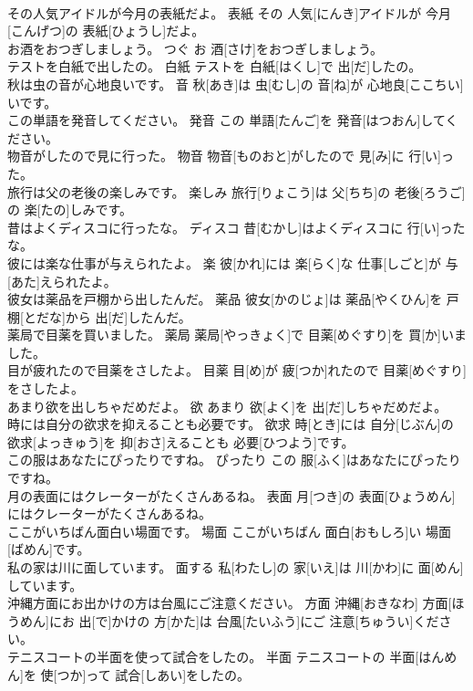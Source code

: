 \documentclass[8pt]{extreport}
\begin{document}
\begin{CJK}{UTF8}{min}
\\	その人気アイドルが今月の表紙だよ。	表紙	その 人気[にんき]アイドルが 今月[こんげつ]の 表紙[ひょうし]だよ。	
\\	お酒をおつぎしましょう。	つぐ	お 酒[さけ]をおつぎしましょう。	
\\	テストを白紙で出したの。	白紙	テストを 白紙[はくし]で 出[だ]したの。	
\\	秋は虫の音が心地良いです。	音	秋[あき]は 虫[むし]の 音[ね]が 心地良[ここちい]いです。	
\\	この単語を発音してください。	発音	この 単語[たんご]を 発音[はつおん]してください。	
\\	物音がしたので見に行った。	物音	物音[ものおと]がしたので 見[み]に 行[い]った。	
\\	旅行は父の老後の楽しみです。	楽しみ	旅行[りょこう]は 父[ちち]の 老後[ろうご]の 楽[たの]しみです。	
\\	昔はよくディスコに行ったな。	ディスコ	昔[むかし]はよくディスコに 行[い]ったな。	
\\	彼には楽な仕事が与えられたよ。	楽	彼[かれ]には 楽[らく]な 仕事[しごと]が 与[あた]えられたよ。	
\\	彼女は薬品を戸棚から出したんだ。	薬品	彼女[かのじょ]は 薬品[やくひん]を 戸棚[とだな]から 出[だ]したんだ。	
\\	薬局で目薬を買いました。	薬局	薬局[やっきょく]で 目薬[めぐすり]を 買[か]いました。	
\\	目が疲れたので目薬をさしたよ。	目薬	目[め]が 疲[つか]れたので 目薬[めぐすり]をさしたよ。	
\\	あまり欲を出しちゃだめだよ。	欲	あまり 欲[よく]を 出[だ]しちゃだめだよ。	
\\	時には自分の欲求を抑えることも必要です。	欲求	時[とき]には 自分[じぶん]の 欲求[よっきゅう]を 抑[おさ]えることも 必要[ひつよう]です。	
\\	この服はあなたにぴったりですね。	ぴったり	この 服[ふく]はあなたにぴったりですね。	
\\	月の表面にはクレーターがたくさんあるね。	表面	月[つき]の 表面[ひょうめん]にはクレーターがたくさんあるね。	
\\	ここがいちばん面白い場面です。	場面	ここがいちばん 面白[おもしろ]い 場面[ばめん]です。	
\\	私の家は川に面しています。	面する	私[わたし]の 家[いえ]は 川[かわ]に 面[めん]しています。	
\\	沖縄方面にお出かけの方は台風にご注意ください。	方面	沖縄[おきなわ] 方面[ほうめん]にお 出[で]かけの 方[かた]は 台風[たいふう]にご 注意[ちゅうい]ください。	
\\	テニスコートの半面を使って試合をしたの。	半面	テニスコートの 半面[はんめん]を 使[つか]って 試合[しあい]をしたの。	

\end{CJK}
\end{document}
